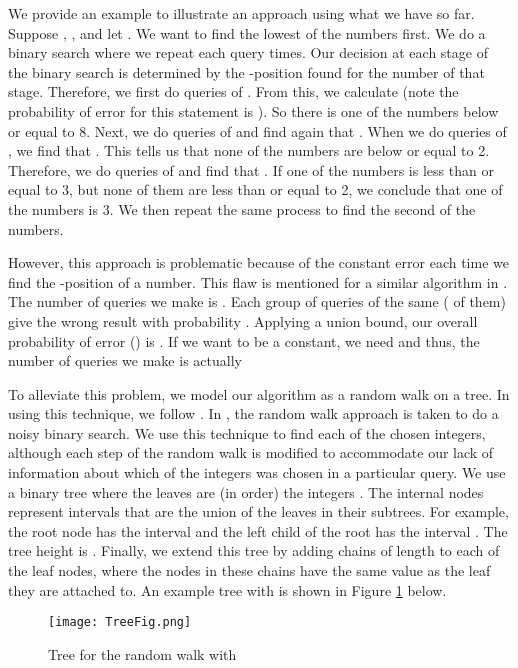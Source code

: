 \documentclass[12pt]{article}
\begin{document}
We provide an example to illustrate an approach using what we have so far. Suppose , ,  and let . We want to find the lowest of the  numbers first. We do a binary search where we repeat each query  times. Our decision at each stage of the binary search is determined by the -position found for the number of that stage. Therefore, we first do  queries of . From this, we calculate  (note the probability of error for this statement is ). So there is one of the  numbers below or equal to 8. Next, we do  queries of  and find again that . When we do  queries of , we find that . This tells us that none of the  numbers are below or equal to 2. Therefore, we do  queries of  and find that . If one of the  numbers is less than or equal to 3, but none of them are less than or equal to 2, we conclude that one of the  numbers is 3. We then repeat the same process to find the second of the  numbers. 

However, this approach is problematic because of the constant error each time we find the -position of a number. This flaw is mentioned for a similar algorithm in \cite{Karp}. The number of queries we make is . Each group of queries of the same  ( of them) give the wrong result with probability . Applying a union bound, our overall probability of error () is . If we want  to be a constant, we need  and thus, the number of queries we make is actually  

To alleviate this problem, we model our algorithm as a random walk on a tree. In using this technique, we follow \cite{Feige}. In \cite{Feige}, the random walk approach is taken to do a noisy binary search. We use this technique to find each of the chosen  integers, although each step of the random walk is modified to accommodate our lack of information about which of the  integers was chosen in a particular query. We use a binary tree where the leaves are (in order) the integers . The internal nodes represent intervals that are the union of the leaves in their subtrees. For example, the root node has the interval  and the left child of the root has the interval . The tree height is . Finally, we extend this tree by adding chains of length  to each of the leaf nodes, where the nodes in these chains have the same value as the leaf they are attached to. An example tree with  is shown in Figure \ref{fig:treefig} below.

\begin{figure}[ht]
	\centering
		\texttt{[image: TreeFig.png]}
	\caption{Tree for the random walk with }
	\label{fig:treefig}
\end{figure} 
\end{document}
